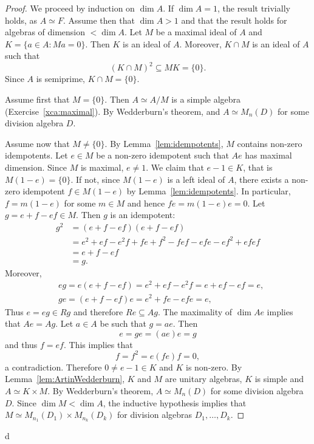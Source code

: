 \begin{proof}
    We proceed by induction on $\dim A$. If $\dim A=1$, the result trivially holds, as 
    $A\simeq F$. Assume
    then that $\dim A>1$ and that the result holds for algebras
    of dimension $<\dim A$. Let $M$ be a maximal ideal of $A$ and 
    $K=\{a\in A:Ma=0\}$. Then $K$ is an ideal of $A$. 
    Moreover, $K\cap M$ is an ideal of $A$
    such that 
    \[
    (K\cap M)^2\subseteq MK=\{0\}.
    \]
    Since $A$ is semiprime, $K\cap M=\{0\}$. 
 
    Assume first that $M=\{0\}$. Then $A\simeq A/M$ is a simple 
    algebra (Exercise~\ref{xca:maximal}). By Wedderburn's theorem, 
    and $A\simeq M_n(D)$ for some division algebra $D$. 
  
    Assume now that $M\ne\{0\}$. By Lemma~\ref{lem:idempotents}, 
    $M$ contains non-zero idempotents. 
    Let $e\in M$ be a non-zero idempotent
    such that $Ae$ has maximal dimension. Since $M$ is maximal, $e\ne 1$. We claim that 
    $e-1\in K$, that is $M(1-e)=\{0\}$. If not, 
    since $M(1-e)$ is a left ideal of $A$,  
    there exists a non-zero idempotent $f\in M(1-e)$  
    by Lemma~\ref{lem:idempotents}. 
    In particular, 
    $f=m(1-e)$ for some $m\in M$ and hence 
    $fe=m(1-e)e=0$. Let $g=e+f-ef\in M$. Then
    $g$ is an idempotent:
    \begin{align*}
    g^2 & =(e+f-ef)(e+f-ef)\\
    &=e^2+ef-e^2f+fe+f^2-fef-efe-ef^2+efef\\
    &=e+f-ef\\
    &=g.
    \end{align*}
    Moreover, 
	\begin{align*}
	&eg=e(e+f-ef)=e^2+ef-e^2f=e+ef-ef=e,\\
	&ge=(e+f-ef)e=e^2+fe-efe=e,
	\end{align*}
    Thus $e=eg\in Rg$ and therefore $Re\subseteq Ag$. The maximality of  
    $\dim Ae$ implies that $Ae=Ag$. Let $a\in A$ be such that $g=ae$. 
    Then
    \[
    e=ge=(ae)e=g
    \]
    and thus $f=ef$. This implies that
    \[
    f=f^2=e(fe)f=0,
    \]
    a contradiction. Therefore $0\ne e-1\in K$ and $K$ is non-zero. 
    By Lemma~\ref{lem:ArtinWedderburn}, $K$ and $M$ are unitary 
    algebras, $K$ is simple and $A\simeq K\times M$. By Wedderburn's theorem,
    $A\simeq M_{n}(D)$ for some division algebra $D$. Since 
    $\dim M<\dim A$, the inductive hypothesis implies that 
    $M\simeq M_{n_1}(D_1)\times M_{n_k}(D_k)$ for
    division algebras $D_1,\dots,D_k$. 
\end{proof}
d